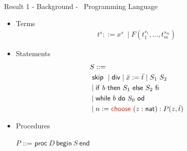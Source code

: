 
\begin{frame}{Result 1 - Background - \WhileCC\ Programming Language}
    \pause
    \footnotesize
    \begin{minipage}[t]{0.33\linewidth}
        \vspace{0.05em}
       \center
        \textbf{\color{Blue}{Syntax}
        }
         \begin{itemize}
                \vspace{0.5em}
                \pause \item Terms
                \vspace{-0.5em}
                        \begin{align*}
                         t^s ::= x^s\ \mid F(t_1^{s_1}, \ldots , t_m^{s_m})
                        \end{align*}
                \vspace{-2.7em}
                \pause \item Statements
                \vspace{-0.5em}
                    \begin{align*}
                        &S ::=\\
                                &\ \mathsf{skip}\
                                \mid \mathsf{div}
                                \mid \bar{x} := \bar{t}
                                \mid S_1\ S_2\\
                                &\mid \mathsf{if}\ b \ \mathsf{then}\ S_1 \ \mathsf{else}\ S_2\ \mathsf{fi}\ \\
                                &\mid \mathsf{while}\ b\ \mathsf{do}\ S_0\ \mathsf{od}
                                \\
                                &\mid n:= \textcolor{BrickRed}{\mathsf{choose\ }} (z: \nat): P(z,\bar{t})
                    \end{align*}
                \vspace{-1.7em}
                \pause \item Procedures
                    \begin{center}
                        $P$ ::= $\mathsf{proc} \ D\ \mathsf{begin}\ S\ \mathsf{end}$
                    \end{center}
                        

\end{itemize}
\end{minipage}
\end{frame}
